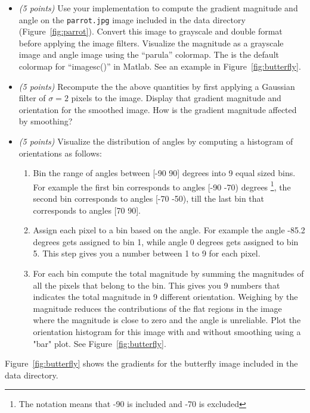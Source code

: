 \documentclass[10pt,letterpaper]{article}
\newcommand{\cmd}[1] {{\color{blue}\texttt{#1}}}
\begin{document}
\begin{itemize}
\item \emph{(5 points)} Use your implementation to compute the
  gradient magnitude and
  angle on the \cmd{parrot.jpg} image included in the data directory (Figure~\ref{fig:parrot}). 
  Convert this image to grayscale and double format before
  applying the image filters.
  Visualize the magnitude as a grayscale
  image and angle image using the ``parula'' colormap. The is the
  default colormap for ``imagesc()'' in Matlab. See an example in
  Figure~\ref{fig:butterfly}.
\item \emph{(5 points)}
  Recompute the the above quantities by first applying a Gaussian
  filter of
  $\sigma=2$ pixels to the image.
  Display that gradient magnitude and orientation for the smoothed
  image. How is the gradient magnitude affected by smoothing?
\item \emph{(5 points)}
  Visualize the distribution of angles by computing a
  histogram of orientations as follows:
  \begin{enumerate}
    \item Bin the range of
      angles between [-90 90] degrees into 9 equal sized bins. 
  For example the first bin corresponds to angles [-90 -70) degrees
    \footnote{The notation means that -90 is included and -70 is excluded}, the
    second bin corresponds to angles [-70 -50), till 
    the last bin that corresponds to angles [70 90]. 
    \item Assign each pixel to a bin based on the angle. For example
      the angle -85.2 degrees gets assigned to bin 1, while angle 0 degrees gets
      assigned to bin 5. This step gives you a number between 1 to 9 for each pixel.
    \item For each bin compute the total magnitude by summing the magnitudes of
      all the pixels that belong to the bin. This gives you
      9 numbers that indicates the total magnitude in 9 different orientation. Weighing by the magnitude reduces the contributions of the flat regions in the image where the magnitude is close to zero and the angle is unreliable.
	  Plot the orientation histogram for this image with and without
  smoothing using a "bar" plot. See Figure~\ref{fig:butterfly}.

  \end{enumerate}
\end{itemize}

Figure~\ref{fig:butterfly} shows the gradients for the
butterfly image included in the data directory.
\end{document}
